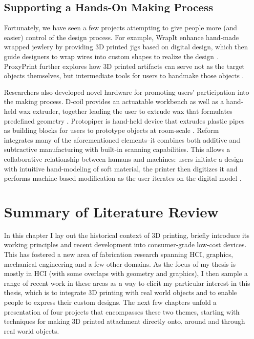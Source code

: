 \subsection{Supporting a Hands-On Making Process}
Fortunately, we have seen a few projects attempting to give people more (and easier) control of the design process. For example, WrapIt enhance hand-made wrapped jewlery by providing 3D printed jigs based on digital design, which then guide designers to wrap wires into custom shapes to realize the design \cite{iarussi2015wrapit}. ProxyPrint further explores how 3D printed artifacts can serve not as the target objects themselves, but intermediate tools for users to handmake those objects \cite{torres2016proxyprint}. 

Researchers also developed novel hardware for promoting users' participation into the making process. D-coil provides an actuatable workbench as well as a hand-held wax extruder, together leading the user to extrude wax that formulates predefined geometry \cite{peng2015d}. Protopiper is hand-held device that extrudes plastic pipes as building blocks for users to prototype objects at room-scale \cite{agrawal2015protopiper}. Reform integrates many of the aforementioned elements--it combines both additive and subtractive manufacturing with built-in scanning capabilities. This allows a collaborative relationship between humans and machines: users initiate a design with intuitive hand-modeling of soft material, the printer then digitizes it and performs machine-based modification as the user iterates on the digital model \cite{weichel2015reform}.


\section{Summary of Literature Review}
In this chapter I lay out the historical context of 3D printing, briefly introduce its working principles and recent development into consumer-grade low-cost devices. This has fostered a new area of fabrication research spanning HCI, graphics, mechanical engineering and a few other domains. As the focus of my thesis is mostly in HCI (with some overlaps with geometry and graphics), I then sample a range of recent work in these areas as a way to elicit my particular interest in this thesis, which is to integrate 3D printing with real world objects and to enable people to express their custom designs. The next few chapters unfold a presentation of four projects that encompasses these two themes, starting with techniques for making 3D printed attachment directly onto, around and through real world objects.